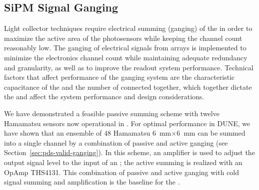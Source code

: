 
\subsection{SiPM Signal Ganging}
\label{sec:pds-design-ganging}

Light collector techniques require electrical summing (ganging) of the  in order to maximize the active area of the photosensors while keeping the channel count reasonably low. The ganging of electrical signals from  arrays is implemented to minimize the electronics channel count while maintaining adequate redundancy and granularity, as well as to improve the readout system performance.  
Technical factors that affect performance of the ganging system are the characteristic capacitance of the  and the number of  connected together, which together dictate the  and affect the system performance and design considerations.

We have demonstrated a feasible passive summing scheme with twelve Hamamatsu  sensors now operational in . For optimal performance in DUNE, we have shown that an ensemble of 48 Hamamatsu \SI{6}{mm}$\times$\SI{6}{mm}  can be summed into a single channel by a combination of passive and active ganging (see Section~\ref{sec:pds-valid-ganging}).  In this scheme, an amplifier is used to adjust the  output signal level to the input of an ; the active summing is realized with an OpAmp THS4131. This combination of passive and active ganging with cold signal summing and amplification is the baseline for the .

